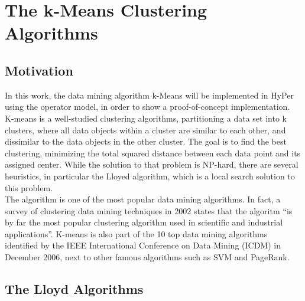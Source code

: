 \chapter{The k-Means Clustering Algorithms}\label{chapter:kmeans}

\section{Motivation}

In this work, the data mining algorithm k-Means will be implemented in HyPer using the operator model, in order to show a proof-of-concept implementation.
\\
K-means is a well-studied clustering algorithms, partitioning a data set into k clusters, where all data objects within a cluster are similar to each other, and dissimilar to the data objects in the other cluster. The goal is to find the best clustering, minimizing the total squared distance between each data point and its assigned center. While the solution to that problem is NP-hard, there are several heuristics, in particular the Lloyed algorithm, which is a local search solution to this problem. 
\\
The algorithm is one of the most popular data mining algorithms. In fact, a survey of clustering data mining techniques in 2002 states that the algoritm “is by far the most popular clustering algorithm used in scientific and industrial applications”. K-means is also part of the 10 top data mining algorithms identified by the IEEE International Conference on Data Mining (ICDM) in December 2006, next to other famous algorithms such as SVM and PageRank. 

\section{The Lloyd Algorithms}

